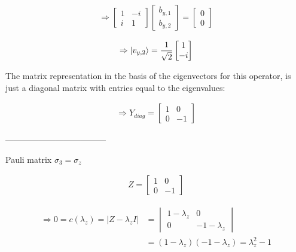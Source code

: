\begin{align}
  \label{eq:2.11.18}
  \Rightarrow
  \begin{bmatrix}
    1 & -i \\
    i & 1
  \end{bmatrix}
  \begin{bmatrix}
    b_{y,1} \\
    b_{y,2}
  \end{bmatrix}
  =
  \begin{bmatrix}
    0 \\
    0
  \end{bmatrix}
\end{align}

\begin{align}
  \label{eq:2.11.19}
  \Rightarrow \ket{v_{y,2}} = \frac{1}{\sqrt{2}}
  \begin{bmatrix}
    1 \\
    -i
  \end{bmatrix} 
\end{align}

The matrix representation in the basis of the eigenvectors for this operator, is just a diagonal matrix with entries equal to the eigenvalues:

\begin{align}
  \label{eq:2.11.20}
  \Rightarrow Y_{diag} =
  \begin{bmatrix}
    1 & 0 \\
    0 & -1
  \end{bmatrix} 
\end{align}


------------------------------------

Pauli matrix $\sigma_3=\sigma_z$

\begin{align}
  \label{eq:2.11.21}
  Z=
  \begin{bmatrix}
    1 & 0 \\
    0 & -1
  \end{bmatrix}
\end{align}

\begin{align}
  \label{eq:2.11.22}
  \Rightarrow 0 = c(\lambda_z)=|Z-\lambda_z I|
  &=
  \begin{vmatrix}
    1-\lambda_z & 0 \\
    0 & -1-\lambda_z
  \end{vmatrix}\\
  &=(1-\lambda_z)(-1-\lambda_z)
  =\lambda_z^2-1
\end{align}

